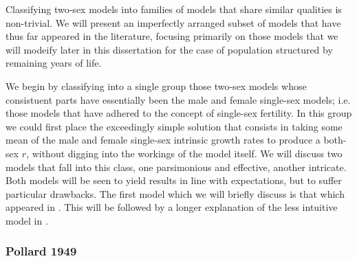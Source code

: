 Classifying two-sex models into families of models that share similar qualities
is non-trivial. We will present an imperfectly arranged subset of models that
have thus far appeared in the literature, focusing primarily on those models
that we will modeify later in this dissertation for the case of
population structured by remaining years of life. 

We begin by classifying into a single group those two-sex models whose
consistuent parts have essentially been the male and female single-sex models; i.e. those
models that have adhered to the concept of single-sex fertility. In this group
we could first place the exceedingly simple solution that consists in taking some 
mean of the male and female single-sex intrinsic growth rates to produce a 
both-sex $r$, without digging into the workings of the model
itself\citep[e.g.][]{kuczynski1932fertility}. We will discuss two models that
fall into this class, one parsimonious and effective, another intricate. Both
models will be seen to yield results in line with expectations, but to suffer
particular drawbacks. The first model which we will briefly discuss is that
which appeared in \citet{pollard1948measurement}. This will be followed by
a longer explanation of the less intuitive model in \citet{mitra1978derivation}.

\subsubsection{Pollard 1949}

